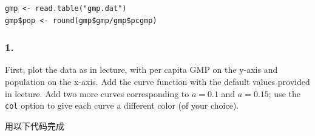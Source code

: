 \documentclass[
]{article}
\newenvironment{Shaded}{\begin{snugshade}}{\end{snugshade}}
\newcommand{\AttributeTok}[1]{\textcolor[rgb]{0.13,0.29,0.53}{#1}}
\newcommand{\CommentTok}[1]{\textcolor[rgb]{0.56,0.35,0.01}{\textit{#1}}}
\newcommand{\FunctionTok}[1]{\textcolor[rgb]{0.13,0.29,0.53}{\textbf{#1}}}
\newcommand{\NormalTok}[1]{#1}
\newcommand{\OtherTok}[1]{\textcolor[rgb]{0.56,0.35,0.01}{#1}}
\newcommand{\SpecialCharTok}[1]{\textcolor[rgb]{0.81,0.36,0.00}{\textbf{#1}}}
\newcommand{\StringTok}[1]{\textcolor[rgb]{0.31,0.60,0.02}{#1}}
\begin{document}
\begin{verbatim}
gmp <- read.table("gmp.dat")
gmp$pop <- round(gmp$gmp/gmp$pcgmp)
\end{verbatim}

\subsubsection{1.}\label{section}

First, plot the data as in lecture, with per capita GMP on the y-axis
and population on the x-axis. Add the curve function with the default
values provided in lecture. Add two more curves corresponding to
\(a=0.1\) and \(a=0.15\); use the \texttt{col} option to give each curve
a different color (of your choice).

用以下代码完成

\begin{Shaded}
\end{Shaded}
\end{document}
